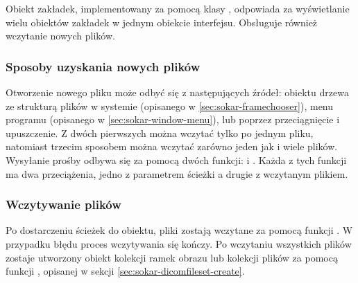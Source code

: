 \label{sec:sokar-dicomtabs}

\par
Obiekt zakładek, implementowany za pomocą klasy , odpowiada za wyświetlanie wielu obiektów zakładek w jednym obiekcie interfejsu.
Obsługuje również wczytanie nowych plików.

\subsubsection{Sposoby uzyskania nowych plików}

\par
Otworzenie nowego pliku może odbyć się z następujących źródeł: obiektu drzewa ze strukturą plików w systemie (opisanego w \ref{sec:sokar-framechooser}), menu programu (opisanego w \ref{sec:sokar-window-menu}), lub poprzez przeciągnięcie i upuszczenie.
Z dwóch pierwszych można wczytać tylko po jednym pliku, natomiast trzecim sposobem można wczytać zarówno jeden jak i wiele plików.
Wysyłanie prośby odbywa się za pomocą dwóch funkcji:  i .
Każda z tych funkcji ma dwa przeciążenia, jedno z parametrem ścieżki a drugie z wczytanym plikiem.

\subsubsection{Wczytywanie plików}

\par
Po dostarczeniu ścieżek do obiektu, pliki zostają wczytane za pomocą funkcji .
W przypadku błędu proces wczytywania się kończy.
Po wczytaniu wszystkich plików zostaje utworzony obiekt kolekcji ramek obrazu lub kolekcji plików \DICOM za pomocą funkcji , opisanej w sekcji \ref{sec:sokar-dicomfileset-create}.
